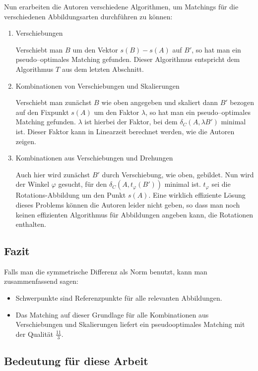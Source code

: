 Nun erarbeiten die Autoren verschiedene Algorithmen, um Matchings für die verschiedenen Abbildungsarten durchführen zu können:
\begin{enumerate}
\item Verschiebungen

Verschiebt man $B$ um den Vektor $s(B)-s(A)$ auf $B'$, so hat man ein pseudo--optimales Matching gefunden. Dieser Algorithmus entspricht dem Algorithmus $T$ aus dem letzten Abschnitt.

\item Kombinationen von Verschiebungen und Skalierungen

Verschiebt man zunächst $B$ wie oben angegeben und skaliert dann $B'$ bezogen auf den Fixpunkt $s(A)$ um den Faktor $\lambda$, so hat man ein pseudo--optimales Matching gefunden. $\lambda$ ist hierbei der Faktor, bei dem $\delta_C(A,\lambda B')$ minimal ist. Dieser Faktor kann in Linearzeit berechnet werden, wie die Autoren zeigen.

\item Kombinationen aus Verschiebungen und Drehungen

Auch hier wird zunächst $B'$ durch Verschiebung, wie oben, gebildet. Nun wird der Winkel $\varphi$ gesucht, für den $\delta_C(A,t_\varphi( B'))$ minimal ist. $t_\varphi$ sei die Rotations-Abbildung um den Punkt $s(A)$. Eine wirklich effiziente Lösung dieses Problems können die Autoren leider nicht geben, so dass man noch keinen effizienten Algorithmus für Abbildungen angeben kann, die Rotationen enthalten. 
\end{enumerate}

\subsection{Fazit}

Falls man die symmetrische Differenz als Norm benutzt, kann man  zusammenfassend sagen:
\begin{itemize}
\item Schwerpunkte sind Referenzpunkte für alle relevanten Abbildungen.
\item Das Matching auf dieser Grundlage für alle Kombinationen aus Verschiebungen und Skalierungen liefert ein pseudooptimales Matching mit der Qualität $\frac{11}{3}$. 
\end{itemize} 
\subsection{Bedeutung für diese Arbeit}\label{BedeutungAFRW}

